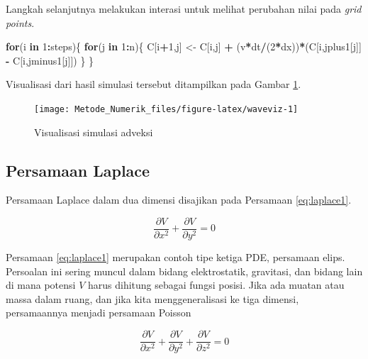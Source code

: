 \documentclass[
]{book}
\newenvironment{Shaded}{\begin{snugshade}}{\end{snugshade}}
\newcommand{\ControlFlowTok}[1]{\textcolor[rgb]{0.13,0.29,0.53}{\textbf{#1}}}
\newcommand{\DecValTok}[1]{\textcolor[rgb]{0.00,0.00,0.81}{#1}}
\newcommand{\NormalTok}[1]{#1}
\newcommand{\OtherTok}[1]{\textcolor[rgb]{0.56,0.35,0.01}{#1}}
\newcommand{\SpecialCharTok}[1]{\textcolor[rgb]{0.81,0.36,0.00}{\textbf{#1}}}
\theoremstyle{definition}
\theoremstyle{definition}
\theoremstyle{definition}
\theoremstyle{definition}
\theoremstyle{remark}
\begin{document}
Langkah selanjutnya melakukan interasi untuk melihat perubahan nilai pada \emph{grid points}.

\begin{Shaded}
\begin{Highlighting}[]
\ControlFlowTok{for}\NormalTok{(i }\ControlFlowTok{in} \DecValTok{1}\SpecialCharTok{:}\NormalTok{steps)\{}
  \ControlFlowTok{for}\NormalTok{(j }\ControlFlowTok{in} \DecValTok{1}\SpecialCharTok{:}\NormalTok{n)\{}
\NormalTok{    C[i}\SpecialCharTok{+}\DecValTok{1}\NormalTok{,j] }\OtherTok{\textless{}{-}}\NormalTok{ C[i,j] }\SpecialCharTok{+}\NormalTok{ (v}\SpecialCharTok{*}\NormalTok{dt}\SpecialCharTok{/}\NormalTok{(}\DecValTok{2}\SpecialCharTok{*}\NormalTok{dx))}\SpecialCharTok{*}\NormalTok{(C[i,jplus1[j]] }\SpecialCharTok{{-}}\NormalTok{ C[i,jminus1[j]])}
\NormalTok{  \}}
\NormalTok{\}}
\end{Highlighting}
\end{Shaded}

Visualisasi dari hasil simulasi tersebut ditampilkan pada Gambar \ref{fig:waveviz}.

\begin{figure}

{\centering \texttt{[image: Metode\_Numerik\_files/figure-latex/waveviz-1]} 

}

\caption{Visualisasi simulasi adveksi}\label{fig:waveviz}
\end{figure}

\hypertarget{laplace}{%
\subsection{Persamaan Laplace}\label{laplace}}

Persamaan Laplace dalam dua dimensi disajikan pada Persamaan \eqref{eq:laplace1}.

\begin{equation}
\frac{\partial V}{\partial x^2}+\frac{\partial V}{\partial y^2}=0
  \label{eq:laplace1}
\end{equation}

Persamaan \eqref{eq:laplace1} merupakan contoh tipe ketiga PDE, persamaan elips. Persoalan ini sering muncul dalam bidang elektrostatik, gravitasi, dan bidang lain di mana potensi \(V\) harus dihitung sebagai fungsi posisi. Jika ada muatan atau massa dalam ruang, dan jika kita menggeneralisasi ke tiga dimensi, persamaannya menjadi persamaan Poisson

\begin{equation}
\frac{\partial V}{\partial x^2}+\frac{\partial V}{\partial y^2}+\frac{\partial V}{\partial z^2}=0
  \label{eq:laplace2}
\end{equation}
\end{document}
